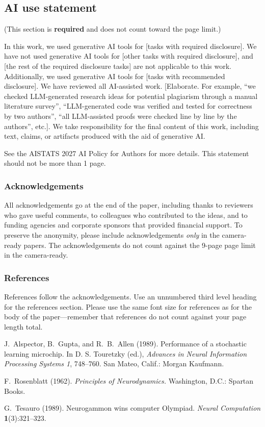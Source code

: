 \documentclass[twoside]{article}
\begin{document}
\subsection*{AI use statement}

(This section is \textbf{required} and does not count toward the page limit.)

In this work, we used generative AI tools for [tasks with required disclosure].
We have not used generative AI tools for [other tasks with required disclosure], and [the rest of the required disclosure tasks] are not applicable to this work.
Additionally, we used generative AI tools for [tasks with recommended disclosure].
We have reviewed all AI-assisted work.
[Elaborate. For example, ``we checked LLM-generated research ideas for potential plagiarism through a manual literature survey'', ``LLM-generated code was verified and tested for correctness by two authors'', ``all LLM-assisted proofs were checked line by line by the authors'', etc.].
We take responsibility for the final content of this work, including text, claims, or artifacts produced with the aid of generative AI.

See the AISTATS 2027 AI Policy for Authors for more details. This statement should not be more than 1 page.

\subsubsection*{Acknowledgements}
All acknowledgements go at the end of the paper, including thanks to reviewers who gave useful comments, to colleagues who contributed to the ideas, and to funding agencies and corporate sponsors that provided financial support.
To preserve the anonymity, please include acknowledgements \emph{only} in the camera-ready papers. The acknowledgements do not count against the 9-page page limit in the camera-ready.


\subsubsection*{References}

References follow the acknowledgements. Use an unnumbered third level
heading for the references section.  Please use the same font
size for references as for the body of the paper---remember that
references do not count against your page length total.

\begin{thebibliography}{}
\setlength{\itemindent}{-\leftmargin}
\makeatletter\renewcommand{\@biblabel}[1]{}\makeatother
\bibitem{} J.~Alspector, B.~Gupta, and R.~B.~Allen (1989).
    \newblock Performance of a stochastic learning microchip.
    \newblock In D. S. Touretzky (ed.),
    \textit{Advances in Neural Information Processing Systems 1}, 748--760.
    San Mateo, Calif.: Morgan Kaufmann.

\bibitem{} F.~Rosenblatt (1962).
    \newblock \textit{Principles of Neurodynamics.}
    \newblock Washington, D.C.: Spartan Books.

\bibitem{} G.~Tesauro (1989).
    \newblock Neurogammon wins computer Olympiad.
    \newblock \textit{Neural Computation} \textbf{1}(3):321--323.
\end{thebibliography}
\end{document}
